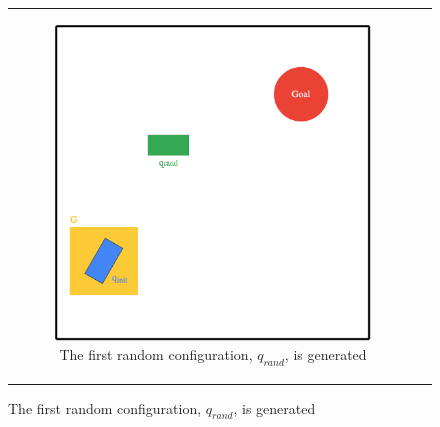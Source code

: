 \begin{figure}[H]
\begin{center}
\begin{tabular}{c c}
\begin{subfigure}{0.45\textwidth}
    \includegraphics[width=\linewidth]{chapters/chapter2/img/RRT_step_by_step-B.png}
    \caption{The first random \gls{configuration}, $q_{rand}$, is generated}
    \label{subfig:rrt-step-by-step-B}
    \end{subfigure} \\


\end{tabular}
\end{center}
\end{figure}
